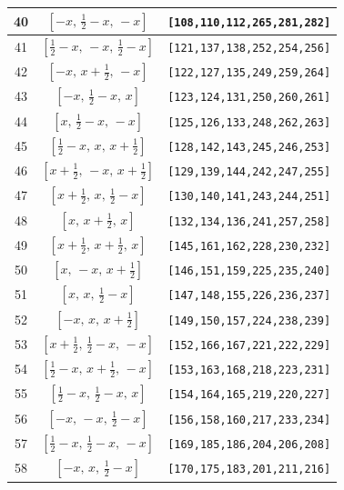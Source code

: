 \documentclass[fleqn,8pt]{jsarticle}
\begin{document}
\begin{longtable}{ccc}
40 & $\left[ - x,\, \frac{1}{2} - x,\, - x \right]$ & {\tt [108,110,112,265,281,282]} \\ \hline
41 & $\left[ \frac{1}{2} - x,\, - x,\, \frac{1}{2} - x \right]$ & {\tt [121,137,138,252,254,256]} \\ \hline
42 & $\left[ - x,\, x + \frac{1}{2},\, - x \right]$ & {\tt [122,127,135,249,259,264]} \\ \hline
43 & $\left[ - x,\, \frac{1}{2} - x,\, x \right]$ & {\tt [123,124,131,250,260,261]} \\ \hline
44 & $\left[ x,\, \frac{1}{2} - x,\, - x \right]$ & {\tt [125,126,133,248,262,263]} \\ \hline
45 & $\left[ \frac{1}{2} - x,\, x,\, x + \frac{1}{2} \right]$ & {\tt [128,142,143,245,246,253]} \\ \hline
46 & $\left[ x + \frac{1}{2},\, - x,\, x + \frac{1}{2} \right]$ & {\tt [129,139,144,242,247,255]} \\ \hline
47 & $\left[ x + \frac{1}{2},\, x,\, \frac{1}{2} - x \right]$ & {\tt [130,140,141,243,244,251]} \\ \hline
48 & $\left[ x,\, x + \frac{1}{2},\, x \right]$ & {\tt [132,134,136,241,257,258]} \\ \hline
49 & $\left[ x + \frac{1}{2},\, x + \frac{1}{2},\, x \right]$ & {\tt [145,161,162,228,230,232]} \\ \hline
50 & $\left[ x,\, - x,\, x + \frac{1}{2} \right]$ & {\tt [146,151,159,225,235,240]} \\ \hline
51 & $\left[ x,\, x,\, \frac{1}{2} - x \right]$ & {\tt [147,148,155,226,236,237]} \\ \hline
52 & $\left[ - x,\, x,\, x + \frac{1}{2} \right]$ & {\tt [149,150,157,224,238,239]} \\ \hline
53 & $\left[ x + \frac{1}{2},\, \frac{1}{2} - x,\, - x \right]$ & {\tt [152,166,167,221,222,229]} \\ \hline
54 & $\left[ \frac{1}{2} - x,\, x + \frac{1}{2},\, - x \right]$ & {\tt [153,163,168,218,223,231]} \\ \hline
55 & $\left[ \frac{1}{2} - x,\, \frac{1}{2} - x,\, x \right]$ & {\tt [154,164,165,219,220,227]} \\ \hline
56 & $\left[ - x,\, - x,\, \frac{1}{2} - x \right]$ & {\tt [156,158,160,217,233,234]} \\ \hline
57 & $\left[ \frac{1}{2} - x,\, \frac{1}{2} - x,\, - x \right]$ & {\tt [169,185,186,204,206,208]} \\ \hline
58 & $\left[ - x,\, x,\, \frac{1}{2} - x \right]$ & {\tt [170,175,183,201,211,216]} \\ \hline

\end{longtable}
\end{document}
